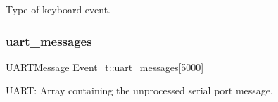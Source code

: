 Type of keyboard event. 

\mbox{\label{group__event_ga5328c084dbec907fc5764e3bc22d15c1}} 
\subsubsection{\texorpdfstring{uart\+\_\+messages}{uart\_messages}}
{\footnotesize\ttfamily \mbox{\hyperlink{struct_u_a_r_t_message}{U\+A\+R\+T\+Message}} Event\+\_\+t\+::uart\+\_\+messages\mbox{[}5000\mbox{]}}



U\+A\+RT\+: Array containing the unprocessed serial port message. 

